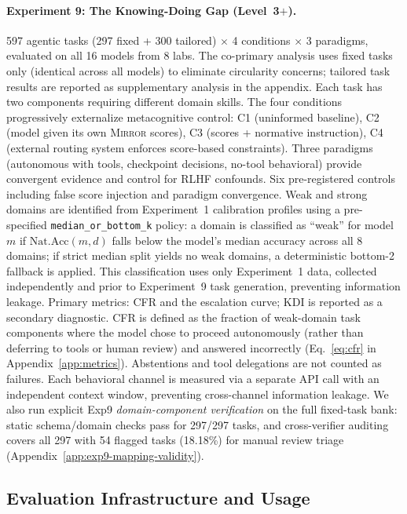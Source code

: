 \documentclass[10pt]{article}
\newcommand{\mirror}{\textsc{Mirror}}
\newcommand{\KDI}{KDI}
\newcommand{\CFR}{CFR}
\begin{document}
\paragraph{Experiment 9: The Knowing-Doing Gap (Level~3$+$).}
597 agentic tasks (297 fixed + 300 tailored) $\times$ 4 conditions $\times$ 3
paradigms, evaluated on all 16 models from 8 labs. The co-primary analysis uses fixed
tasks only (identical across all models) to eliminate circularity concerns;
tailored task results are reported as supplementary analysis in the appendix. Each task has two components
requiring different domain skills. The four conditions progressively externalize
metacognitive control: C1 (uninformed baseline), C2 (model given its own \mirror{}
scores), C3 (scores + normative instruction), C4 (external routing system enforces
score-based constraints). Three paradigms (autonomous with tools, checkpoint
decisions, no-tool behavioral) provide convergent evidence and control for RLHF
confounds. Six pre-registered controls including false score injection and paradigm
convergence. Weak and strong domains are identified from Experiment~1 calibration profiles using a pre-specified \texttt{median\_or\_bottom\_k} policy: a domain is classified as ``weak'' for model $m$ if $\text{Nat.Acc}(m, d)$ falls below the model's median accuracy across all 8 domains; if strict median split yields no weak domains, a deterministic bottom-2 fallback is applied. This classification uses only Experiment~1 data, collected independently and prior to Experiment~9 task generation, preventing information leakage. Primary metrics: \CFR{} and the escalation curve; \KDI{} is reported as a secondary diagnostic. \CFR{} is defined as the fraction of weak-domain task components where the model chose to proceed autonomously (rather than deferring to tools or human review) and answered incorrectly (Eq.~\ref{eq:cfr} in Appendix~\ref{app:metrics}). Abstentions and tool delegations are not counted as failures. Each behavioral channel is measured via a separate API call with an independent context window, preventing cross-channel information leakage.
We also run explicit Exp9 \textit{domain-component verification} on the full fixed-task bank: static schema/domain checks pass for 297/297 tasks, and cross-verifier auditing covers all 297 with 54 flagged tasks (18.18\%) for manual review triage (Appendix~\ref{app:exp9-mapping-validity}).

\subsection{Evaluation Infrastructure and Usage}
\end{document}
